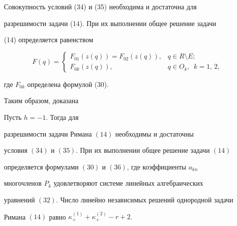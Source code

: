 Совокупность условий (34) и (35) необходима и достаточна для


разрешимости задачи (14). При их выполнении общее решение задачи


(14) определяется равенством


\begin{equation}


F(q)=


\begin{cases}


F_{01}(z(q))=F_{02}(z(q)), & q\in R\setminus E;\\


F_{0k}(z(q)), & q\in O_k,\ \; k=1,\,2,


\end{cases}


\end{equation}


где $F_{0k}$ определена формулой (30).





Таким образом, доказана





\begin{thm}


Пусть $h=-1$. Тогда для


разрешимости задачи Римана $(14)$ необходимы и достаточны


условия $(34)$ и $(35)$. При их выполнении общее решение задачи $(14)$


определяется формулами $(30)$ и $(36)$, где коэффициенты $a_{kn}$


многочленов $P_k$ удовлетворяют системе линейных алгебраических


уравнений $(32)$. Число линейно независимых решений однородной задачи


Римана $(14)$ равно $\kappa_+^{(1)}+\kappa_+^{(2)}-r+2$.


\end{thm}





